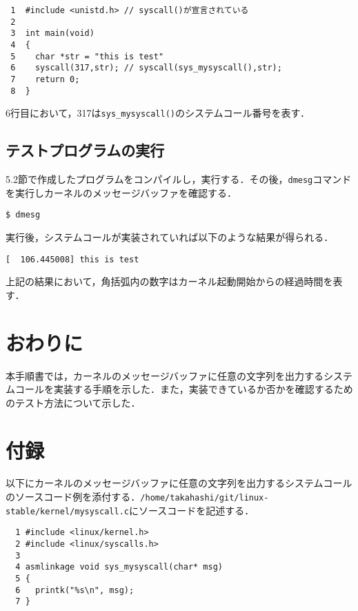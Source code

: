 \documentclass[12pt]{jsarticle}
\begin{document}
\begin{verbatim}
 1  #include <unistd.h> // syscall()が宣言されている
 2 
 3  int main(void)
 4  {
 5    char *str = "this is test"
 6    syscall(317,str); // syscall(sys_mysyscall(),str);
 7    return 0;
 8  } 
\end{verbatim}
6行目において，317は\verb|sys_mysyscall()|のシステムコール番号を表す．

\subsection{テストプログラムの実行}
5.2節で作成したプログラムをコンパイルし，実行する．その後，\verb|dmesg|コマンドを実行しカーネルのメッセージバッファを確認する．

\begin{verbatim}
$ dmesg
\end{verbatim}

実行後，システムコールが実装されていれば以下のような結果が得られる．
\begin{verbatim}
[  106.445008] this is test
\end{verbatim}
上記の結果において，角括弧内の数字はカーネル起動開始からの経過時間を表す．

\section{おわりに}
\label{sec:conclusion}
本手順書では，カーネルのメッセージバッファに任意の文字列を出力するシステムコールを実装する手順を示した．また，実装できているか否かを確認するためのテスト方法について示した．

\section{付録}
\label{appendix}
以下にカーネルのメッセージバッファに任意の文字列を出力するシステムコールのソースコード例を添付する．\verb|/home/takahashi/git/linux-stable/kernel/mysyscall.c|にソースコードを記述する．
\begin{verbatim}
  1 #include <linux/kernel.h> 
  2 #include <linux/syscalls.h>
  3
  4 asmlinkage void sys_mysyscall(char* msg)
  5 {
  6   printk("%s\n", msg); 
  7 }
\end{verbatim}




\end{document}
